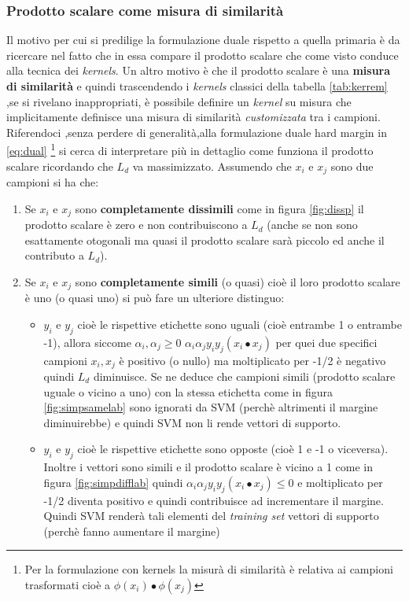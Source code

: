 \subsubsection{Prodotto scalare come misura di similarità}
\label{subsub:prscal}
Il motivo per cui si predilige la formulazione duale rispetto a quella primaria è da ricercare nel fatto che in essa compare il prodotto scalare che come visto conduce alla tecnica dei \textit{kernels}. Un altro motivo è che il prodotto scalare è una \textbf{misura di similarità} e quindi trascendendo i \textit{kernels} classici della tabella \ref{tab:kerrem} ,se si rivelano inappropriati, è possibile definire un \textit{kernel} su misura che implicitamente definisce una misura di similarità \textit{customizzata} tra i campioni. Riferendoci ,senza perdere di generalità,alla formulazione duale hard margin in \eqref{eq:dual} \footnote{Per la formulazione con kernels la misurà di similarità è relativa ai campioni trasformati cioè a $\phi(x_i) \bullet \phi(x_j)$} si cerca di interpretare più in dettaglio come funziona il prodotto scalare ricordando che $L_d$ va massimizzato. Assumendo che $x_i$ e $x_j$ sono due campioni  si ha che:
\begin{enumerate}
\item Se $x_i \text{ e } x_j$ sono \textbf{completamente dissimili} come in figura \ref{fig:dissp} il prodotto scalare è zero e non contribuiscono a $L_d$ (anche se non sono esattamente otogonali ma quasi il prodotto scalare sarà piccolo ed anche il contributo a $L_d$).
\item Se $x_i \text{ e } x_j$ sono \textbf{completamente simili} (o quasi) cioè il loro prodotto scalare è uno (o quasi uno) si può fare un ulteriore distinguo:
\begin{itemize}
\item $y_i \text{ e } y_j$ cioè le rispettive etichette sono uguali (cioè entrambe 1 o entrambe -1), allora siccome $\alpha_i,\alpha_j \geq 0$ $\alpha_i\alpha_jy_iy_j(x_i \bullet x_j)$ per quei due specifici campioni $x_i,x_j$ è positivo (o nullo) ma moltiplicato per -1/2 è negativo quindi $L_d$ diminuisce. Se ne deduce che campioni simili (prodotto scalare uguale o vicino a uno) con la stessa etichetta come in figura \ref{fig:simpsamelab} sono ignorati da \ac{SVM} (perchè altrimenti il margine diminuirebbe) e quindi \ac{SVM} non li rende vettori di supporto.
\item $y_i \text{ e } y_j$ cioè le rispettive etichette sono opposte (cioè 1 e -1 o viceversa). Inoltre i vettori sono simili e il prodotto scalare è vicino a 1 come in figura \ref{fig:simpdifflab} quindi $\alpha_i\alpha_jy_iy_j(x_i \bullet x_j) \leq 0$ e moltiplicato per -1/2 diventa positivo e quindi contribuisce ad incrementare il margine. Quindi \ac{SVM} renderà tali elementi del \textit{training set} vettori di supporto (perchè fanno aumentare il margine) 
\end{itemize}
\end{enumerate}

